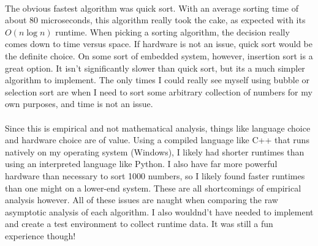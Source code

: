 \documentclass[12pt]{article}
\begin{document}
\paragraph{}
The obvious fastest algorithm was quick sort.  With an average sorting time of about 80 microseconds, this algorithm really took the cake, as expected with its $O(n\log n)$ runtime.  When picking a sorting algorithm, the decision really comes down to time versus space.  If hardware is not an issue, quick sort would be the definite choice.  On some sort of embedded system, however, insertion sort is a great option.  It isn't significantly slower than quick sort, but its a much simpler algorithm to implement.  The only times I could really see myself using bubble or selection sort are when I need to sort some arbitrary collection of numbers for my own purposes, and time is not an issue.

\paragraph{}
Since this is empirical and not mathematical analysis, things like language choice and hardware choice are of value.  Using a compiled language like C++ that runs natively on my operating system (Windows), I likely had shorter runtimes than using an interpreted language like Python.  I also have far more powerful hardware than necessary to sort 1000 numbers, so I likely found faster runtimes than one might on a lower-end system.  These are all shortcomings of empirical analysis however.  All of these issues are naught when comparing the raw asymptotic analysis of each algorithm.  I also wouldnd't have needed to implement and create a test environment to collect runtime data.  It was still a fun experience though!
\end{document}
